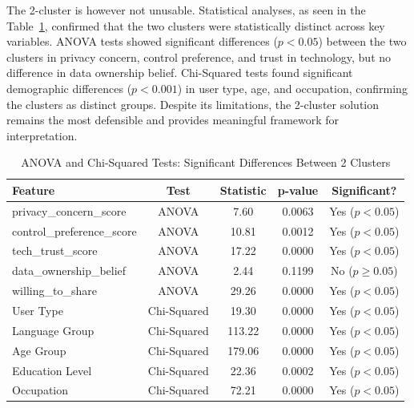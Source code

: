 	The 2-cluster is however not unusable. Statistical analyses, as seen in the Table~\ref{tab:cluster_significance}, confirmed that the two clusters were statistically distinct across key variables. ANOVA tests showed significant differences ($p < 0.05$) between the two clusters in privacy concern, control preference, and trust in technology, but no difference in data ownership belief. Chi-Squared tests found significant demographic differences ($p < 0.001$) in user type, age, and occupation, confirming the clusters as distinct groups. Despite its limitations, the 2-cluster solution remains the most defensible and provides meaningful framework for interpretation.
	\begin{table}[ht]
		\centering
		\begin{tabular}{lcccc}
			\toprule
			\textbf{Feature} & \textbf{Test} & \textbf{Statistic} & \textbf{p-value} & \textbf{Significant?} \\
			\midrule
			privacy\_concern\_score    & ANOVA        & 7.60      & 0.0063  & Yes ($p < 0.05$) \\
			control\_preference\_score & ANOVA        & 10.81     & 0.0012  & Yes ($p < 0.05$) \\
			tech\_trust\_score         & ANOVA        & 17.22     & 0.0000  & Yes ($p < 0.05$) \\
			data\_ownership\_belief    & ANOVA        & 2.44      & 0.1199  & No ($p \geq 0.05$) \\
			willing\_to\_share         & ANOVA        & 29.26     & 0.0000  & Yes ($p < 0.05$) \\
			\midrule
			User Type                  & Chi-Squared  & 19.30     & 0.0000  & Yes ($p < 0.05$) \\
			Language Group             & Chi-Squared  & 113.22    & 0.0000  & Yes ($p < 0.05$) \\
			Age Group                  & Chi-Squared  & 179.06    & 0.0000  & Yes ($p < 0.05$) \\
			Education Level            & Chi-Squared  & 22.36     & 0.0002  & Yes ($p < 0.05$) \\
			Occupation                 & Chi-Squared  & 72.21     & 0.0000  & Yes ($p < 0.05$) \\
			\bottomrule
		\end{tabular}
		\caption{ANOVA and Chi-Squared Tests: Significant Differences Between 2 Clusters}
		\label{tab:cluster_significance}
	\end{table}
